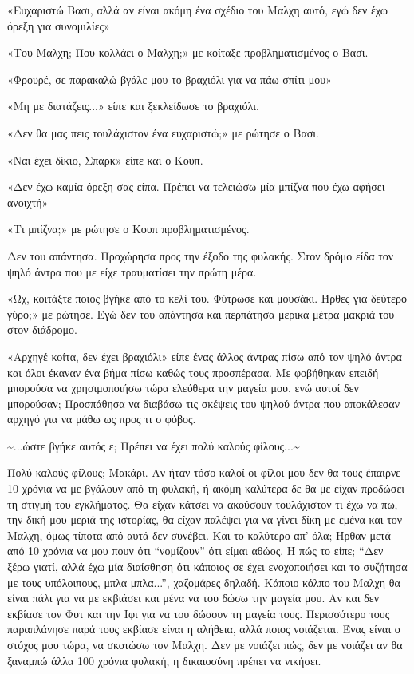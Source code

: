 \documentclass[12pt,twoside, openany]{book}
\begin{document}
«Ευχαριστώ Βασι, αλλά αν είναι ακόμη ένα σχέδιο του Μαλχη αυτό, εγώ δεν έχω όρεξη για συνομιλίες»

«Του Μαλχη; Που κολλάει ο Μαλχη;» με κοίταξε προβληματισμένος ο Βασι.

«Φρουρέ, σε παρακαλώ βγάλε μου το βραχιόλι για να πάω σπίτι μου»

«Μη με διατάζεις...» είπε και ξεκλείδωσε το βραχιόλι.

«Δεν θα μας πεις τουλάχιστον ένα ευχαριστώ;» με ρώτησε ο Βασι.

«Ναι έχει δίκιο, Σπαρκ» είπε και ο Κουπ.

«Δεν έχω καμία όρεξη σας είπα. Πρέπει να τελειώσω μία μπίζνα που έχω αφήσει ανοιχτή»

«Τι μπίζνα;» με ρώτησε ο Κουπ προβληματισμένος.

Δεν του απάντησα. Προχώρησα προς την έξοδο της φυλακής. Στον δρόμο είδα τον ψηλό άντρα που με είχε τραυματίσει την πρώτη μέρα.

«Ωχ, κοιτάξτε ποιος βγήκε από το κελί του. Φύτρωσε και μουσάκι. Ήρθες για δεύτερο γύρο;» με ρώτησε. Εγώ δεν του απάντησα και περπάτησα μερικά μέτρα μακριά του στον διάδρομο.

«Αρχηγέ κοίτα, δεν έχει βραχιόλι» είπε ένας άλλος άντρας πίσω από τον ψηλό άντρα και όλοι έκαναν ένα βήμα πίσω καθώς τους προσπέρασα. Με φοβήθηκαν επειδή μπορούσα να χρησιμοποιήσω τώρα ελεύθερα την μαγεία μου, ενώ αυτοί δεν μπορούσαν; Προσπάθησα να διαβάσω τις σκέψεις του ψηλού άντρα που αποκάλεσαν αρχηγό για να μάθω ως προς τι ο φόβος.

\textasciitilde ...ώστε βγήκε αυτός ε; Πρέπει να έχει πολύ καλούς φίλους...\textasciitilde 

Πολύ καλούς φίλους; Μακάρι. Αν ήταν τόσο καλοί οι φίλοι μου δεν θα τους έπαιρνε 10 χρόνια να με βγάλουν από τη φυλακή, ή ακόμη καλύτερα δε θα με είχαν προδώσει τη στιγμή του εγκλήματος. Θα είχαν κάτσει να ακούσουν τουλάχιστον τι έχω να πω, την δική μου μεριά της ιστορίας, θα είχαν παλέψει για να γίνει δίκη με εμένα και τον Μαλχη, όμως τίποτα από αυτά δεν συνέβει. Και το καλύτερο απ’ όλα; Ήρθαν μετά από 10 χρόνια να μου πουν ότι “νομίζουν” ότι είμαι αθώος. Ή πώς το είπε; “Δεν ξέρω γιατί, αλλά έχω μία διαίσθηση ότι κάποιος σε έχει ενοχοποιήσει και το συζήτησα με τους υπόλοιπους, μπλα μπλα...”, χαζομάρες δηλαδή. Κάποιο κόλπο του Μαλχη θα είναι πάλι για να με εκβιάσει και μένα να του δώσω την μαγεία μου. Αν και δεν εκβίασε τον Φυτ και την Ιφι για να του δώσουν τη μαγεία τους. Περισσότερο τους παραπλάνησε παρά τους εκβίασε είναι η αλήθεια, αλλά ποιος νοιάζεται. Ένας είναι ο στόχος μου τώρα, να σκοτώσω τον Μαλχη. Δεν με νοιάζει πώς, δεν με νοιάζει αν θα ξαναμπώ άλλα 100 χρόνια φυλακή, η δικαιοσύνη πρέπει να νικήσει.
\end{document}
